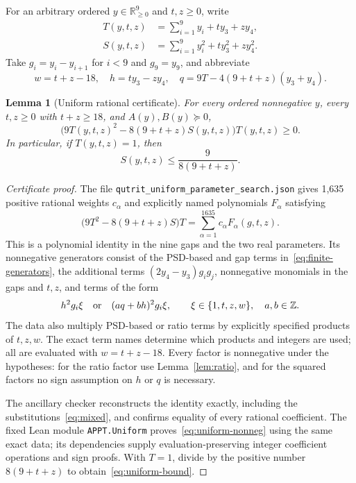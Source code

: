 \documentclass[11pt]{article}
\newtheorem{lemma}[theorem]{Lemma}
\theoremstyle{remark}\newtheorem{remark}[theorem]{Remark}
\newcommand{\R}{\mathbb R}
\begin{document}
For an arbitrary ordered $y\in\R^9_{\geq0}$ and $t,z\geq0$, write
\begin{align}
 T(y,t,z)&=\sum_{i=1}^9y_i+t y_3+z y_4,\label{eq:uniform-T}\\
 S(y,t,z)&=\sum_{i=1}^9y_i^2+t y_3^2+z y_4^2.\label{eq:uniform-S}
\end{align}
Take $g_i=y_i-y_{i+1}$ for $i<9$ and $g_9=y_9$, and abbreviate
\begin{equation}\label{eq:mixed}
 w=t+z-18,\quad h=t y_3-z y_4,\quad
 q=9T-4(9+t+z)(y_3+y_4).
\end{equation}

\begin{lemma}[Uniform rational certificate]\label{lem:uniform}
For every ordered nonnegative $y$, every $t,z\geq0$ with $t+z\geq18$, and $A(y),B(y)\succeq0$,
\begin{equation}\label{eq:uniform-nonneg}
 \bigl(9T(y,t,z)^2-8(9+t+z)S(y,t,z)\bigr)T(y,t,z)\geq0.
\end{equation}
In particular, if $T(y,t,z)=1$, then
\begin{equation}\label{eq:uniform-bound}
 S(y,t,z)\leq\frac{9}{8(9+t+z)}.
\end{equation}
\end{lemma}
\begin{proof}[Certificate proof]
The file \texttt{qutrit\_uniform\_parameter\_search.json} gives 1,635 positive rational weights $c_\alpha$ and explicitly named polynomials $F_\alpha$ satisfying
\begin{equation}\label{eq:uniform-cert}
 \bigl(9T^2-8(9+t+z)S\bigr)T
 =\sum_{\alpha=1}^{1635}c_\alpha F_\alpha(g,t,z).
\end{equation}
This is a polynomial identity in the nine gaps and the two real parameters. Its nonnegative generators consist of the PSD-based and gap terms in~\eqref{eq:finite-generators}, the additional terms $(2y_4-y_3)g_i g_j$, nonnegative monomials in the gaps and $t,z$, and terms of the form
\begin{equation}\label{eq:square-generators}
 h^2g_i\xi\quad\hbox{or}\quad (a q+b h)^2g_i\xi,
 \qquad \xi\in\{1,t,z,w\},\quad a,b\in\mathbb Z.
\end{equation}
The data also multiply PSD-based or ratio terms by explicitly specified products of $t,z,w$. The exact term names determine which products and integers are used; all are evaluated with $w=t+z-18$. Every factor is nonnegative under the hypotheses: for the ratio factor use Lemma~\ref{lem:ratio}, and for the squared factors no sign assumption on $h$ or $q$ is necessary.

The ancillary checker reconstructs the identity exactly, including the substitutions~\eqref{eq:mixed}, and confirms equality of every rational coefficient. The fixed Lean module \texttt{APPT.Uniform} proves~\eqref{eq:uniform-nonneg} using the same exact data; its dependencies supply evaluation-preserving integer coefficient operations and sign proofs. With $T=1$, divide by the positive number $8(9+t+z)$ to obtain~\eqref{eq:uniform-bound}.
\end{proof}
\end{document}
